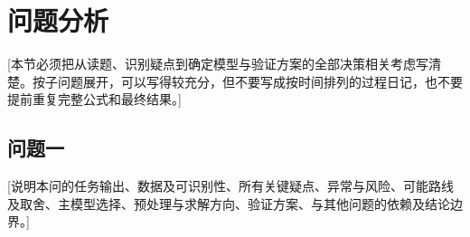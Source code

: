 \section{问题分析}

[本节必须把从读题、识别疑点到确定模型与验证方案的全部决策相关考虑写清楚。按子问题展开，可以写得较充分，但不要写成按时间排列的过程日记，也不要提前重复完整公式和最终结果。]

\subsection{问题一}

[说明本问的任务输出、数据及可识别性、所有关键疑点、异常与风险、可能路线及取舍、主模型选择、预处理与求解方向、验证方案、与其他问题的依赖及结论边界。]
